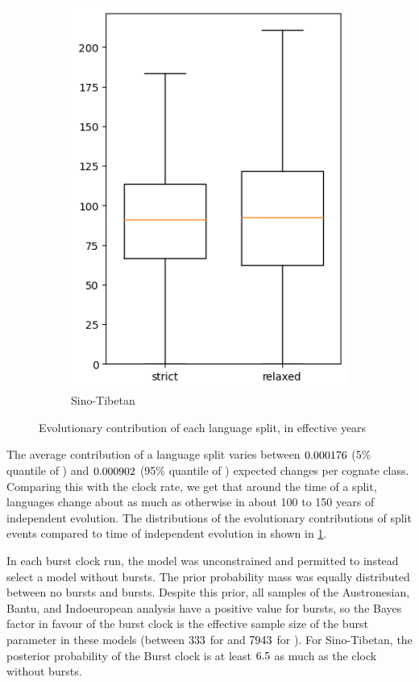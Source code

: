 \documentclass[a4paper,12pt]{scrartcl}
\begin{document}
\begin{figure}
\begin{subfigure}{0.4\textwidth}
    \includegraphics[width=\textwidth]{supplement/analysis/sinotibetan_years_per_split.png}
    \caption{Sino-Tibetan}
  \end{subfigure}
  \caption{Evolutionary contribution of each language split, in effective years}
  \label{f:peryear}
\end{figure}


The average contribution of a language split varies between $0.000176$ (5\%
quantile of \minn) and $0.000902$ (95\% quantile of \maxn)
expected changes per cognate class. Comparing this with the clock rate, we get
that around the time of a split, languages change about as much as otherwise in
about 100 to 150 years of independent evolution. The distributions of the
evolutionary contributions of split events compared to time of independent
evolution in shown in \cref{f:peryear}.

In each burst clock run, the model was unconstrained and permitted to instead
select a model without bursts. The prior probability mass was equally distributed
between no bursts and bursts. Despite this prior, all samples of the
Austronesian, Bantu, and Indoeuropean analysis have a positive value for bursts,
so the Bayes factor in favour of the burst clock is the effective sample size of
the burst parameter in these models (between $333$ for \minessn{} and
$7943$ for \maxessn{}). For Sino-Tibetan,
the posterior probability of the Burst clock is at least $6.5$ as much as the clock
without bursts.
\end{document}
